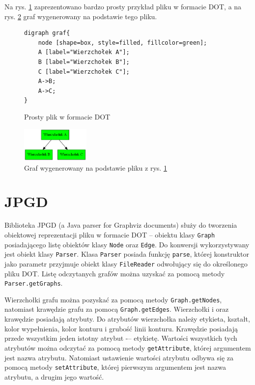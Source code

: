 Na rys. \ref{fig:dot_example} zaprezentowano bardzo prosty przykład pliku w formacie DOT, a na rys. \ref{fig:dot_graph} graf wygenerowany na podstawie tego pliku.

\begin{figure}
\begin{verbatim}
digraph graf{
    node [shape=box, style=filled, fillcolor=green];
    A [label="Wierzchołek A"];
    B [label="Wierzchołek B"];
    C [label="Wierzchołek C"];
    A->B;
    A->C;
}
\end{verbatim}
\caption{Prosty plik w formacie DOT}
\label{fig:dot_example}
\end{figure}


\begin{figure}[H]
\begin{center}
\includegraphics[width=0.3\textwidth]{img/graf.png}
\end{center}
\caption{Graf wygenerowany na podstawie pliku z rys. \ref{fig:dot_example}}
\label{fig:dot_graph}
\end{figure}

\section{JPGD}

Biblioteka JPGD (a Java parser for Graphviz documents) \cite{JPGD} służy do tworzenia obiektowej reprezentacji pliku w formacie DOT -- obiektu klasy \texttt{Graph} posiadającego listę obiektów klasy \texttt{Node} oraz \texttt{Edge}. Do konwersji wykorzystywany jest obiekt klasy \texttt{Parser}. Klasa \texttt{Parser} posiada funkcję \texttt{parse}, której konstruktor jako parametr przyjmuje obiekt klasy \texttt{FileReader} odwołujący się do określonego pliku DOT. Listę odczytanych grafów można uzyskać za pomocą metody \texttt{Parser.getGraphs}.

Wierzchołki grafu można pozyskać za pomocą metody \texttt{Graph.getNodes}, natomiast  krawędzie grafu za pomocą \texttt{Graph.getEdges}. Wierzchołki i oraz krawędzie posiadają atrybuty. Do atrybutów wierzchołka należy etykieta, kształt, kolor wypełnienia, kolor konturu i grubość linii konturu. Krawędzie posiadają przede wszystkim jeden istotny atrybut -– etykietę. Wartości wszystkich tych atrybutów można odczytać za pomocą metody \texttt{getAttribute}, której argumentem jest nazwa atrybutu. Natomiast ustawienie  wartości atrybutu odbywa się za pomocą metody \texttt{setAttribute}, której pierwszym argumentem jest nazwa atrybutu, a drugim jego wartość. 

